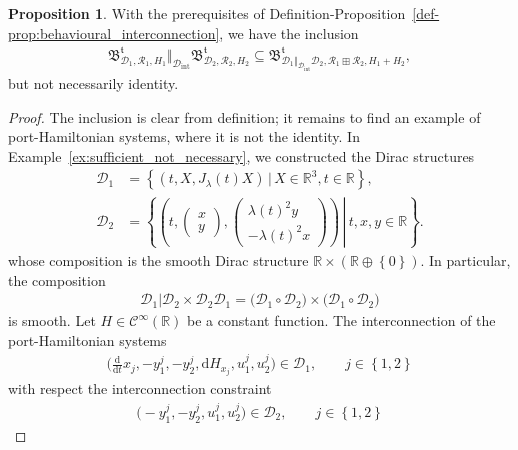 \documentclass[preprint,12pt]{elsarticle}
\theoremstyle{definition}
\newtheorem{proposition}[theorem]{Proposition}
\newcommand{\set}[1]{\left\lbrace #1\right\rbrace}
\begin{document}
\begin{proposition}\label{prop:mono_but_not_epi}
With the prerequisites of Definition-Proposition~\ref{def-prop:behavioural_interconnection}, we have the inclusion
\begin{align*}
\mathfrak{B}^{\mathfrak{t}}_{\mathcal{D}_1,\mathcal{R}_1,H_1}\Vert_{\mathcal{D}_{\mathrm{int}}}\mathfrak{B}^{\mathfrak{t}}_{\mathcal{D}_2,\mathcal{R}_2,H_2}\subseteq\mathfrak{B}^{\mathfrak{t}}_{\mathcal{D}_1\Vert_{\mathcal{D}_{\mathrm{int}}}\mathcal{D}_2,\mathcal{R}_1\boxplus\mathcal{R}_2,H_1+H_2},
\end{align*}
but not necessarily identity. 
\end{proposition}
\begin{proof}
The inclusion is clear from definition; it remains to find an example of port-Hamiltonian systems, where it is not the identity. In Example~\ref{ex:sufficient_not_necessary}, we constructed the Dirac structures
\begin{align*}
\mathcal{D}_{1} & = \set{(t,X,J_{\lambda}(t)X)\,\big\vert\,X\in\mathbb{R}^3,t\in\mathbb{R}},\\
\mathcal{D}_{2} & = \set{\left.\left(t,\begin{pmatrix}
x\\y
\end{pmatrix},\begin{pmatrix}
\lambda(t)^2y\\-\lambda(t)^2x
\end{pmatrix}\right)\,\right\vert\,t,x,y\in\mathbb{R}}.
\end{align*}
whose composition is the smooth Dirac structure $\mathbb{R}\times (\mathbb{R}\oplus\set{0})$. In particular, the composition
\begin{align*}
\mathcal{D}_1\vert{\mathcal{D}_2\times\mathcal{D}_2}\mathcal{D}_1 = \big(\mathcal{D}_1\circ\mathcal{D}_2\big)\times\big(\mathcal{D}_1\circ\mathcal{D}_2\big)
\end{align*}
is smooth. Let $H\in\mathcal{C}^\infty(\mathbb{R})$ be a constant function. The interconnection of the port-Hamiltonian systems
\begin{align*}
\big(\tfrac{\mathrm{d}}{\mathrm{d}t}x_j,-y_1^j,-y_2^j,\mathrm{d}H_{x_j},u_1^j,u_2^j\big)\in\mathcal{D}_1,\qquad j\in\set{1,2}
\end{align*}
with respect the interconnection constraint
\begin{align*}
\big(-y_1^j,-y_2^j,u_1^j,u_2^j\big)\in\mathcal{D}_2,\qquad j\in\set{1,2}
\end{align*}

\end{proof}
\end{document}
